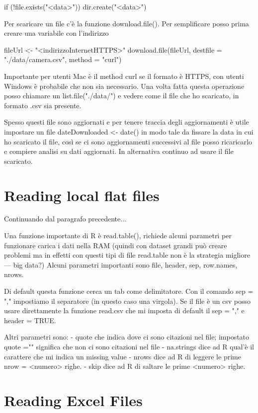 if (!file.exists("<data>")) {
	dir.create("<data>")
}

Per scaricare un file c'è la funzione download.file().
Per semplificare posso prima creare una variabile con l'indirizzo

fileUrl <- "<indirizzoInternetHTTPS>"
download.file(fileUrl, destfile = "./data/camera.csv", method = "curl")

Importante per utenti Mac è il method curl se il formato è HTTPS, con utenti Windows è probabile che non sia
necessario.
Una volta fatta questa operazione posso chiamare un list.file("./data/") e vedere come 
il file che ho scaricato, in formato .csv sia presente.

Spesso questi file sono aggiornati e per tenere traccia degli aggiornamenti è utile
impostare un file dateDownloaded <- date() in modo tale da fissare la data in cui
ho scaricato il file, così se ci sono aggiornamenti successivi al file posso ricaricarlo
e compiere analisi su dati aggiornati. In alternativa continuo ad usare il file scaricato.


\section{Reading local flat files}


Continuando dal paragrafo precedente...

Una funzione importante di R è read.table(), richiede alcuni parametri per funzionare
carica i dati nella RAM (quindi con dataset grandi può creare problemi ma in effetti con questi tipi di file read.table non è la strategia migliore --- big data?)
Alcuni parametri importanti sono file, header, sep, row.names, nrows.

Di default questa funzione cerca un tab come delimitatore. Con il comando sep = "," impostiamo il separatore (in questo caso una virgola).
Se il file è un csv posso usare direttamente la funzione read.csv che mi imposta di default il sep = "," e header = TRUE.

Altri parametri sono:
- quote che indica dove ci sono citazioni nel file; impostato quote ="" significa che non ci sono citazioni nel file
- na.strings dice ad R qual'è il carattere che mi indica un missing value
- nrows dice ad R di leggere le prime nrow = <numero> righe.
- skip dice ad R di saltare le prime <numero> righe.


\section{Reading Excel Files}

